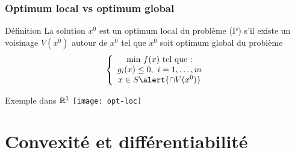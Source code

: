 \documentclass{beamer}
\newcommand{\R}{{\ensuremath\mathbb{R}}}
\begin{document}
\begin{frame}
{  }
\end{frame}

\begin{frame}
  \frametitle{Optimum local vs optimum global}

  \begin{block}{Définition}
    La solution $x^0$ est un optimum local du problème (P) s'il existe un voisinage
    $V(x^0)$ autour de $x^0$ tel que $x^0$ soit optimum global du problème
  \[
  \left\{
  \begin{array}{c}
    \text{min} \ f(x) \ \text{tel que :} \\
    g_i(x) \leq 0, \ i = 1, \dots, m \\
    x \in S \alert{\cap V(x^0)}
  \end{array}
  \right.
  \]
  \end{block}

  \begin{exampleblock}{Exemple dans $\R^1$}
    \centering
    \texttt{[image: opt-loc]}
  \end{exampleblock}
  
\end{frame}

\section{Convexité et différentiabilité}
\end{document}
